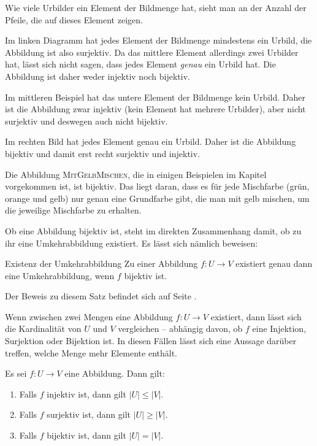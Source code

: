 \documentclass[../../main.tex]{subfiles}
\begin{document}
Wie viele Urbilder ein Element der Bildmenge hat, sieht man an der Anzahl der Pfeile, die auf dieses Element zeigen.

Im linken Diagramm hat jedes Element der Bildmenge mindestens ein Urbild, die Abbildung ist also surjektiv. Da das mittlere Element allerdings zwei Urbilder hat, lässt sich nicht sagen, dass jedes Element \emph{genau} ein Urbild hat. Die Abbildung ist daher weder injektiv noch bijektiv.

Im mittleren Beispiel hat das untere Element der Bildmenge kein Urbild. Daher ist die Abbildung zwar injektiv (kein Element hat mehrere Urbilder), aber nicht surjektiv und deswegen auch nicht bijektiv.

Im rechten Bild hat jedes Element genau ein Urbild. Daher ist die Abbildung bijektiv und damit erst recht surjektiv und injektiv.

\begin{advexample}{}
    Die Abbildung \textsc{MitGelbMischen}, die in einigen Beispielen im Kapitel vorgekommen ist, ist bijektiv. Das liegt daran, dass es für jede Mischfarbe (grün, orange und gelb) nur genau eine Grundfarbe gibt, die man mit gelb mischen, um die jeweilige Mischfarbe zu erhalten.
\end{advexample}

Ob eine Abbildung bijektiv ist, steht im direkten Zusammenhang damit, ob zu ihr eine Umkehrabbildung existiert. Es lässt sich nämlich beweisen:

\begin{theorem}{Existenz der Umkehrabbildung}
    Zu einer Abbildung $f\colon U\rightarrow V$ existiert genau dann eine Umkehrabbildung, wenn $f$ bijektiv ist.
\end{theorem}

Der Beweis zu diesem Satz befindet sich auf Seite \pageref{proof:existenceOfInverseMap}.

Wenn zwischen zwei Mengen eine Abbildung $f\colon U\rightarrow V$ existiert, dann lässt sich die Kardinalität von $U$ und $V$ vergleichen -- abhängig davon, ob $f$ eine Injektion, Surjektion oder Bijektion ist. In diesen Fällen lässt sich eine Aussage darüber treffen, welche Menge mehr Elemente enthält.

\begin{theorem}{}
    Es sei $f\colon U\rightarrow V$ eine Abbildung. Dann gilt:
    \begin{enumerate}
        \item Falls $f$ injektiv ist, dann gilt $|U|\leq |V|$.
        \item Falls $f$ surjektiv ist, dann gilt $|U|\geq |V|$.
        \item Falls $f$ bijektiv ist, dann gilt $|U|=|V|$.
    \end{enumerate}
\end{theorem}
\end{document}
